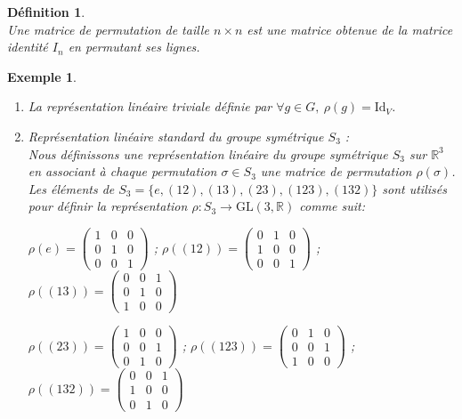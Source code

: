 \documentclass[a4paper, 14pt]{report}
\newtheorem{definition}{Définition}[section]
\newtheorem{example}{Exemple}[section]
\begin{document}
\begin{onehalfspace}
{			\begin{definition} \cite{cheung2018algebre}\\
				Une matrice de permutation de taille \( n \times n \) est une matrice obtenue de la matrice identité \( I_n \) en permutant ses lignes.	
			\end{definition}
			
			
			\begin{example}\
				\begin{enumerate}
					\item La représentation linéaire triviale définie par \(\forall g \in G, \ \rho(g) = \mathrm{Id}_V\).
					\item Représentation linéaire standard du groupe symétrique \( S_3 \) :\\
					Nous définissons une représentation linéaire du groupe symétrique \( S_3 \) sur \( \mathbb{R}^3 \) en associant à chaque permutation \( \sigma \in S_3 \) une matrice de permutation \( \rho(\sigma) \). Les éléments de \( S_3 = \{e, (12), (13), (23), (123), (132)\} \) sont utilisés pour définir la représentation \( \rho : S_3 \to \mathrm{GL}(3, \mathbb{R}) \) comme suit:
					
					\(	\rho(e) = \begin{pmatrix}
						1 & 0 & 0 \\
						0 & 1 & 0 \\
						0 & 0 & 1
					\end{pmatrix} 
					\) 	
					;
					\(
					\rho((12)) = \begin{pmatrix}
						0 & 1 & 0 \\
						1 & 0 & 0 \\
						0 & 0 & 1
					\end{pmatrix}
					\)
					;		
					\(
					\rho((13)) = \begin{pmatrix}
						0 & 0 & 1 \\
						0 & 1 & 0 \\
						1 & 0 & 0
					\end{pmatrix}
					\)
					
					
					\(
					\rho((23)) = \begin{pmatrix}
						1 & 0 & 0 \\
						0 & 0 & 1 \\
						0 & 1 & 0
					\end{pmatrix}
					\)
					;
					\(
					\rho((123)) = \begin{pmatrix}
						0 & 1 & 0 \\
						0 & 0 & 1 \\
						1 & 0 & 0
					\end{pmatrix}
					\)
					;		
					\(
					\rho((132)) = \begin{pmatrix}
						0 & 0 & 1 \\
						1 & 0 & 0 \\
						0 & 1 & 0
					\end{pmatrix}
					\)
					

\end{enumerate}
\end{example}}
\end{onehalfspace}
\end{document}
